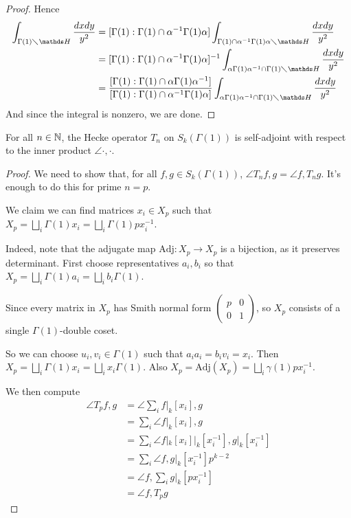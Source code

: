 \documentclass[10pt,a4paper]{article}
\begin{document}
\begin{proof}
  Hence
  \begin{align*}
    \int_{\Gamma(1)\diagdown \H} \frac{dxdy}{y^2} &= [\Gamma(1): \Gamma(1)\cap \alpha^{-1}\Gamma(1)\alpha] \int_{\Gamma(1)\cap \alpha^{-1}\Gamma(1)\alpha \diagdown \H}\frac{dxdy}{y^2}\\
    &= [\Gamma(1):\Gamma(1)\cap \alpha^{-1}\Gamma(1)\alpha]^{-1}\int_{\alpha\Gamma(1)\alpha^{-1}\cap \Gamma(1)\diagdown \H}\frac{dxdy}{y^2}\\
    &= \frac{[\Gamma(1):\Gamma(1)\cap \alpha\Gamma(1)\alpha^{-1}]}{[\Gamma(1):\Gamma(1)\cap \alpha^{-1}\Gamma(1)\alpha]}\int_{\alpha\Gamma(1)\alpha^{-1}\cap \Gamma(1)\diagdown \H}\frac{dxdy}{y^2}
  \end{align*}
  And since the integral is nonzero, we are done.
\end{proof}
\begin{proposition}
  For all $n \in \mathbb{N}$, the Hecke operator $T_n$ on $S_k(\Gamma(1))$ is self-adjoint with respect to the inner product $\angle{\cdot,\cdot}$.
\end{proposition}
\begin{proof}
  We need to show that, for all $f, g \in S_k(\Gamma(1))$, $\angle{T_n f,g} = \angle{f, T_n g}$. It's enough to do this for prime $n = p$.

  We claim we can find matrices $x_i \in X_p$ such that $X_p = \bigsqcup_i \Gamma(1)x_i = \bigsqcup_i \Gamma(1)px_i^{-1}$.

  Indeed, note that the adjugate map $\text{Adj}:X_p \to X_p$ is a bijection, as it preserves determinant. First choose representatives $a_i, b_i$ so that $X_p = \bigsqcup_i \Gamma(1)a_i = \bigsqcup_i b_i\Gamma(1)$.

  Since every matrix in $X_p$ has Smith normal form $\begin{pmatrix} p & 0 \\ 0 & 1 \end{pmatrix}$, so $X_p$ consists of a single $\Gamma(1)$-double coset.

  So we can choose $u_i, v_i \in \Gamma(1)$ such that $a_i a_i = b_i v_i = x_i$. Then $X_p = \bigsqcup_i \Gamma(1)x_i = \bigsqcup_i x_i \Gamma(1)$. Also $X_p = \text{Adj}(X_p) = \bigsqcup_i \gamma(1)p x_i^{-1}$.

  We then compute
  \begin{align*}
    \angle{T_p f, g} &= \angle{\sum_i f|_k[x_i], g} \\
    &= \sum_i \angle{f|_k[x_i],g} \\
    &= \sum_i \angle{f|_k[x_i]|_k[x_i^{-1}], g|_k [x_i^{-1}]} \\
    &= \sum_i \angle{f, g|_{k}[x_i^{-1}]}p^{k-2} \\
    &= \angle{f, \sum_i g|_k[px_i^{-1}]}\\
    &= \angle{f, T_p g}
  \end{align*}
\end{proof}
\end{document}
